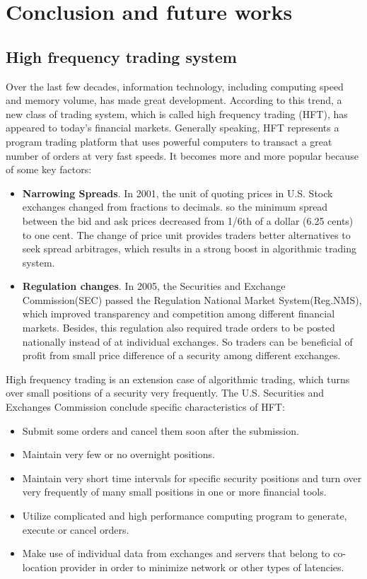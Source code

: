 \chapter{Conclusion and future works}
\section{High frequency trading system}
Over the last few decades, information technology, including computing speed and memory volume, has made great development. According to this trend, a new class of trading system, which is called high frequency trading (HFT), has appeared to today's financial markets. Generally speaking,  HFT represents a program trading platform that uses powerful computers to transact a great number of orders at very fast speeds. It becomes more and more popular because of some key factors:\\
\begin{itemize}
\item \textbf{Narrowing Spreads}. In 2001, the unit of quoting prices in U.S. Stock exchanges changed from fractions to decimals. so the minimum spread between the bid and ask prices decreased from 1/6th of a dollar (6.25 cents) to one cent. The change of  price unit provides traders better alternatives to seek spread arbitrages, which results in a strong boost in algorithmic trading system.  \\
\item \textbf{Regulation changes}. In 2005, the Securities and Exchange Commission(SEC) passed the Regulation National Market System(Reg.NMS), which improved transparency and competition among different financial markets. Besides, this regulation also required trade orders to be posted nationally instead of at individual exchanges. So traders can be beneficial of profit from small price difference of a security among different exchanges. \\
\end{itemize}

High frequency trading is an extension case of algorithmic trading, which turns over small positions of a security very frequently. The U.S. Securities and Exchanges Commission conclude specific characteristics of HFT:\\

\begin{itemize}
\item Submit some orders and cancel them soon after the submission.
\item Maintain very few or no overnight positions. 
\item Maintain very short time intervals for specific security positions and turn over very frequently of many small positions in one or more financial tools.
\item Utilize complicated and high performance computing program to generate, execute or cancel orders.
\item Make use of individual data from exchanges and servers that belong to co-location provider in order to minimize network or other types of latencies. 
\end{itemize}

